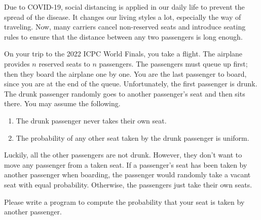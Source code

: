 Due to COVID-19, social distancing is applied in our daily life to prevent
the spread of the disease. It changes our living styles a lot, especially 
the way of traveling. 
Now, many carriers cancel non-reserved seats and introduce seating rules 
to ensure that the distance between any two passengers is long enough.

On your trip to the 2022 ICPC World Finals, you take a flight.
The airplane provides $n$ reserved seats to $n$ passengers.
The passengers must queue up first; then they board the airplane one by one.
You are the last passenger to board, since you are at the end
of the queue.
Unfortunately, the first passenger is drunk.
The drunk passenger randomly goes to another passenger's seat 
and then sits there.
You may assume the following.
\begin{enumerate}
\item The drunk passenger never takes their own seat.
\item The probability of any other seat taken by the drunk passenger is uniform.
\end{enumerate}

Luckily, all the other passengers are not drunk. However, they don't want 
to move any passenger from a taken seat. If a passenger's seat has been taken 
by another passenger when boarding, the passenger would randomly take a 
vacant seat with equal probability. 
Otherwise, the passengers just take their own seats.

Please write a program to compute the probability that your seat is taken
by another passenger.
